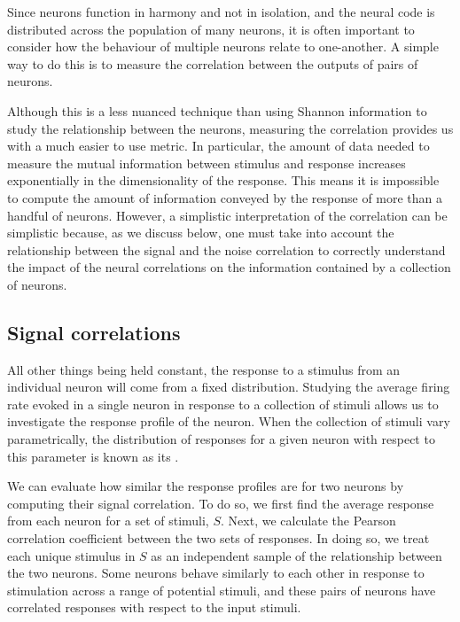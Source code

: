 Since neurons function in harmony and not in isolation, and the neural code is distributed across the population of many neurons, it is often important to consider how the behaviour of multiple neurons relate to one-another.
A simple way to do this is to measure the correlation between the outputs of pairs of neurons.

Although this is a less nuanced technique than using Shannon information to study the relationship between the neurons, measuring the correlation provides us with a much easier to use metric.
In particular, the amount of data needed to measure the mutual information between stimulus and response increases exponentially in the dimensionality of the response.
This means it is impossible to compute the amount of information conveyed by the response of more than a handful of neurons.
However, a simplistic interpretation of the correlation can be simplistic because, as we discuss below, one must take into account the relationship between the signal and the noise correlation to correctly understand the impact of the neural correlations on the information contained by a collection of neurons.


\subsection{Signal correlations}
\label{sec:bg-sigcorr}

All other things being held constant, the response to a stimulus from an individual neuron will come from a fixed distribution.
Studying the average firing rate evoked in a single neuron in response to a collection of stimuli allows us to investigate the response profile of the neuron.
When the collection of stimuli vary parametrically, the distribution of responses for a given neuron with respect to this parameter is known as its .

We can evaluate how similar the response profiles are for two neurons by computing their signal correlation.
To do so, we first find the average response from each neuron for a set of stimuli, $S$.
Next, we calculate the Pearson correlation coefficient between the two sets of responses.
In doing so, we treat each unique stimulus in $S$ as an independent sample of the relationship between the two neurons.
Some neurons behave similarly to each other in response to stimulation across a range of potential stimuli, and these pairs of neurons have correlated responses with respect to the input stimuli.

